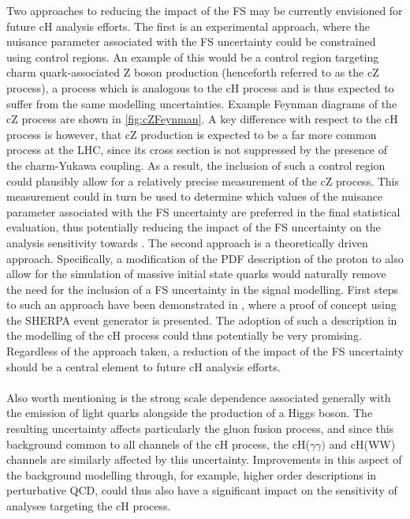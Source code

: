 Two approaches to reducing the impact of the FS may be currently envisioned for future cH analysis efforts. The first is an experimental approach, where the nuisance parameter associated with the FS uncertainty could be constrained using control regions. An example of this would be a control region targeting charm quark-associated Z boson production (henceforth referred to as the cZ process), a process which is analogous to the cH process and is thus expected to suffer from the same modelling uncertainties. Example Feynman diagrams of the cZ process are shown in \autoref{fig:cZFeynman}. A key difference with respect to the cH process is however, that cZ production is expected to be a far more common process at the LHC, since its cross section is not suppressed by the presence of the charm-Yukawa coupling. As a result, the inclusion of such a control region could plausibly allow for a relatively precise measurement of the cZ process. This measurement could in turn be used to determine which values of the nuisance parameter associated with the FS uncertainty are preferred in the final statistical evaluation, thus potentially reducing the impact of the FS uncertainty on the analysis sensitivity towards \kappac. The second approach is a theoretically driven approach. Specifically, a modification of the PDF description of the proton to also allow for the simulation of massive initial state quarks would naturally remove the need for the inclusion of a FS uncertainty in the signal modelling. First steps to such an approach have been demonstrated in \cite{M5FS}, where a proof of concept using the \textsf{SHERPA}\cite{SHERPA} event generator is presented. The adoption of such a description in the modelling of the cH process could thus potentially be very promising. Regardless of the approach taken, a reduction of the impact of the FS uncertainty should be a central element to future cH analysis efforts. \\
\\
Also worth mentioning is the strong scale dependence associated generally with the emission of light quarks alongside the production of a Higgs boson. The resulting uncertainty affects particularly the gluon fusion process, and since this background common to all channels of the cH process, the cH($\gamma\gamma)$ and cH(WW) channels are similarly affected by this uncertainty. Improvements in this aspect of the background modelling through, for example, higher order descriptions in perturbative QCD, could thus also have a significant impact on the sensitivity of analyses targeting the cH process. \\
